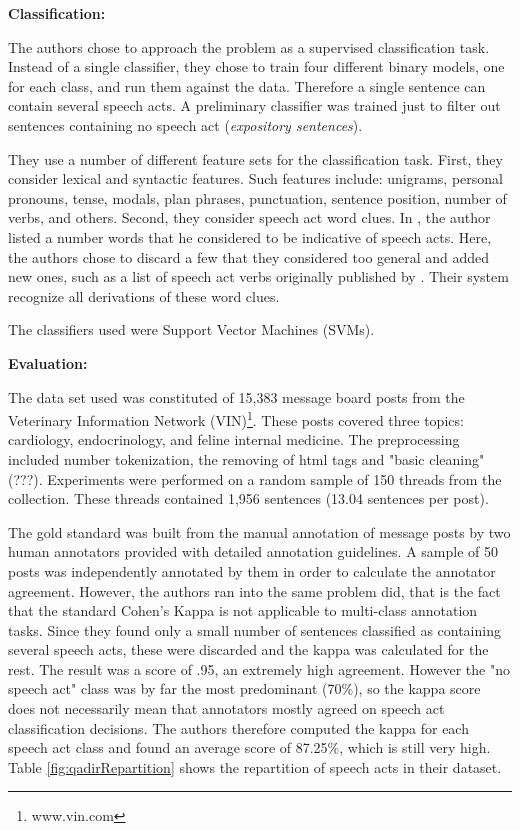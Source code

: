 \documentclass[11pt]{article}
\begin{document}
\vspace{0.5cm}
\textbf{Classification:}
\vspace{0.1cm}

The authors chose to approach the problem as a supervised classification task. Instead of a single classifier, they chose to train four different binary models, one for each class, and run them against the data. Therefore a single sentence can contain several speech acts. A preliminary classifier was trained just to filter out sentences containing no speech act (\textit{expository sentences}).

They use a number of different feature sets for the classification task. First, they consider lexical and syntactic features. Such features include: unigrams, personal pronouns, tense, modals, plan phrases, punctuation, sentence position, number of verbs, and others. Second, they consider speech act word clues. In \cite{searle1976taxonomy}, the author listed a number words that he considered to be indicative of speech acts. Here, the authors chose to discard a few that they considered too general and added new ones, such as a list of speech act verbs originally published by \cite{wierzbicka1987english}. Their system recognize all derivations of these word clues.

The classifiers used were Support Vector Machines (SVMs).

\vspace{0.5cm}
\textbf{Evaluation:}
\vspace{0.1cm}

The data set used was constituted of 15,383 message board posts from the Veterinary Information Network (VIN)\footnote{www.vin.com}. These posts covered three topics: cardiology, endocrinology, and feline internal medicine. The preprocessing included number tokenization, the removing of html tags and "basic cleaning" (???). Experiments were performed on a random sample of 150 threads from the collection. These threads contained 1,956 sentences (13.04 sentences per post).

The gold standard was built from the manual annotation of message posts by two human annotators provided with detailed annotation guidelines. A sample of 50 posts was independently annotated by them in order to calculate the annotator agreement. However, the authors ran into the same problem \cite{kim2010taggingandlinking} did, that is the fact that the standard Cohen's Kappa is not applicable to multi-class annotation tasks. Since they found only a small number of sentences classified as containing several speech acts, these were discarded and the kappa was calculated for the rest. The result was a score of .95, an extremely high agreement. However the "no speech act" class was by far the most predominant (70\%), so the kappa score does not necessarily mean that annotators mostly agreed on speech act classification decisions. The authors therefore computed the kappa for each speech act class and found an average score of 87.25\%, which is still very high. Table \ref{fig:qadirRepartition} shows the repartition of speech acts in their dataset.
\end{document}
